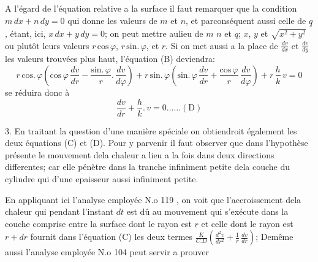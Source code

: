 \documentclass[11pt,a4paper]{article}
\begin{document}
A l'égard de l'équation relative a la surface il faut remarquer
que la condition $m\,dx + n\,dy = 0$ qui donne les valeurs de
$m$ et $n$, et parconséquent aussi celle de $\underline{q}$, étant, ici, $x\,dx + y\,dy = 0$;
on peut mettre aulieu de $m$ $n$ et $q$; $x$, $y$ et $\sqrt{x^{2}+y^{2}}$
ou plutôt leurs valeurs $r\,\text{cos}\,\varphi$, $r\,\text{sin.}\,\varphi$, et $\underline{r}$. Si on 
met aussi a la place de $\frac{dv}{dx}$ et $\frac{dv}{dy}$ les valeurs trouvées
plus haut, l'équation (B) deviendra:
\[ r\,\text{cos.}\,\varphi\left(\text{cos}\,\varphi\,\frac{dv}{dr} - \frac{\text{sin.}\,\varphi}{r}.\,\frac{dv}{d\varphi}\right) + r\,\text{sin.}\,\varphi\left(\text{sin.}\,\varphi\,\frac{dv}{dr} + \frac{\text{cos}\,\varphi}{r}\,\frac{dv}{d\varphi}\right) + r\,\frac{h}{k}\,v = 0 \]
 se réduira donc à
\[ \frac{dv}{dr} + \frac{h}{k}.\,v = 0 \ldots\ldots (\text{D}) \]

3. En traitant la question d'une manière spéciale
on obtiendroit également les deux équations (C) et (D).
Pour y parvenir il faut observer que dans l'hypothèse
présente le mouvement dela chaleur a lieu a la fois
dans deux directions differentes; car elle pénètre dans la
tranche infiniment petite dela couche du cylindre qui
  d'une epaisseur aussi infiniment
petite.

En appliquant ici l'analyse employée N.o 119 , on voit
que l'accroissement dela chaleur qui pendant l'instant
$dt$ est dû au mouvement qui s'exécute dans la couche
comprise entre la surface dont le rayon est $\underline{r}$ et
celle dont le rayon est $r + dr$ fournit dans l'équation
(C) les deux termes $\frac{K}{C.D}\left(\frac{d^{2}v}{dr^{2}} + \frac{1}{r}\,\frac{dv}{dr}\right)$; Demême
aussi l'analyse employée N.o 104 peut servir a prouver
\end{document}
